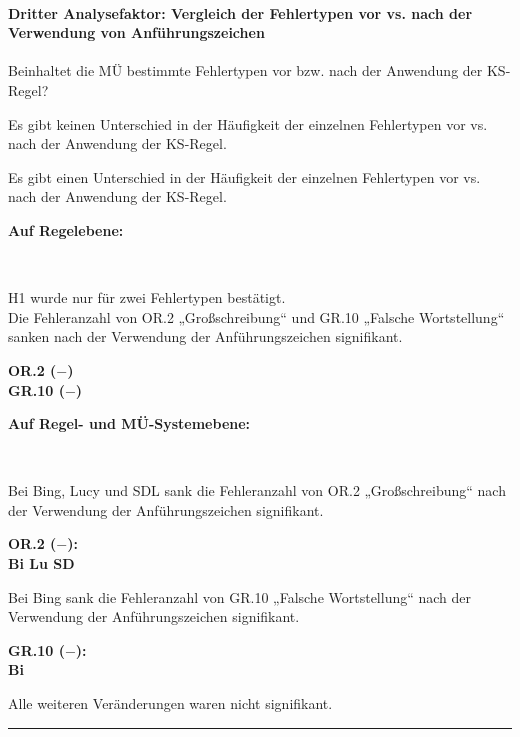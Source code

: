 \paragraph*{Dritter Analysefaktor: Vergleich der Fehlertypen vor vs. nach der Verwendung von Anführungszeichen}
\begin{description}[font=\normalfont\bfseries]
\item [Fragestellung:] Beinhaltet die MÜ bestimmte Fehlertypen vor bzw. nach der Anwendung der KS-Regel?
\item [H0 --] Es gibt keinen Unterschied in der Häufigkeit der einzelnen Fehlertypen vor vs. nach der Anwendung der KS-Regel.
\item [H1 --] Es gibt einen Unterschied in der Häufigkeit der einzelnen Fehlertypen vor vs. nach der Anwendung der KS-Regel.
\item [Resultat] {}
\end{description}
\parbox[t]{.8\textwidth}{\textbf{Auf Regelebene:}}\\
\noindent
\parbox[t]{.8\textwidth}{
H1 wurde nur für zwei Fehlertypen bestätigt.\\
Die Fehleranzahl von OR.2 „Großschreibung“ und GR.10 „Falsche Wortstellung“ sanken nach der Verwendung der Anführungszeichen signifikant.
}
\parbox[t]{.04\textwidth}{}
\colorbox{smGreen}{\parbox[t]{.15\textwidth}{
\textbf{OR.2 ($-$)}\\
\textbf{GR.10 ($-$)}
\vspace{24pt}
}}

\noindent
\parbox[t]{.8\textwidth}{\textbf{Auf Regel- und MÜ-Systemebene:}}\\
\noindent
\parbox[t]{.8\textwidth}{
Bei Bing, Lucy und SDL sank die Fehleranzahl von OR.2 „Großschreibung“ nach der Verwendung der Anführungszeichen signifikant.
}
\parbox[t]{.04\textwidth}{}
\colorbox{smGreen}{\parbox[t]{.15\textwidth}{
\textbf{OR.2 ($-$):}\\
\textbf{Bi Lu SD}\\
}}

\medskip
\noindent
\parbox[t]{.8\textwidth}{
Bei Bing sank die Fehleranzahl von GR.10 „Falsche Wortstellung“ nach der Verwendung der Anführungszeichen signifikant.
}
\parbox[t]{.04\textwidth}{}
\colorbox{smGreen}{\parbox[t]{.15\textwidth}{
\textbf{GR.10 ($-$):}\\
\textbf{Bi}
}}

\medskip
\noindent
\parbox[t]{.8\textwidth}{
Alle weiteren Veränderungen waren nicht signifikant.
}

\hrule
